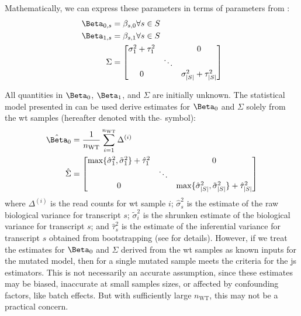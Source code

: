 Mathematically, we can express these parameters in terms of parameters from :
%
\begin{align*}
  \Beta_{0,s} & = \beta_{s,0} \forall s \in S \\
  \Beta_{1,s} & = \beta_{s,1} \forall s \in S \\
  \Sigma      & = \begin{bmatrix}
    \sigma_1^2 + \tau_1^2 &        & 0                             \\
                          & \ddots                                 \\
    0                     &        & \sigma_{|S|}^2 + \tau_{|S|}^2 \\
  \end{bmatrix}
\end{align*}

All quantities in $\Beta_0$, $\Beta_1$, and $\Sigma$ are initially unknown.
The statistical model presented in \cite[REF][]{pimentelDifferentialAnalysisRNAseq2017} can be used derive estimates for $\Beta_0$ and $\Sigma$ solely from the \gls{wt} samples (hereafter denoted with the $\hat{}$ symbol):
%
\begin{align*}
  \hat{\Beta}_0 & = \frac{1}{n_\mathrm{WT}} \sum_{i = 1}^{n_\mathrm{WT}} \Delta^{(i)} \\
  \hat{\Sigma}  & = \begin{bmatrix}
    \max\{\hat{\sigma}_1^2, \tilde{\sigma}_1^2\} + \hat{\tau}_1^2 &        & 0                                                                         \\
                                                                  & \ddots                                                                             \\
    0                                                             &        & \max\{\hat{\sigma}_{|S|}^2, \tilde{\sigma}_{|S|}^2\} + \hat{\tau}_{|S|}^2 \\
  \end{bmatrix}
\end{align*}
%
where $\Delta^{(i)}$ is the read counts for \gls{wt} sample $i$; $\hat{\sigma}_s^2$ is the estimate of the raw biological variance for transcript $s$; $\tilde{\sigma}_i^2$ is the shrunken estimate of the biological variance for transcript $s$; and $\hat{\tau}_s^2$ is the estimate of the inferential variance for transcript $s$ obtained from bootstrapping (see \cite[REF][]{pimentelDifferentialAnalysisRNAseq2017} for details).
However, if we treat the estimates for $\Beta_0$ and $\Sigma$ derived from the \gls{wt} samples as known inputs for the mutated model, then  for a single mutated sample meets the criteria for the \gls{js} estimators.
This is not necessarily an accurate assumption, since these estimates may be biased, inaccurate at small samples sizes, or affected by confounding factors, like batch effects.
But with sufficiently large $n_\mathrm{WT}$, this may not be a practical concern.

